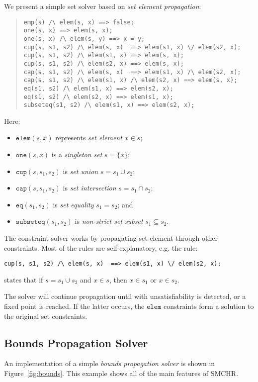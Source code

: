 \documentclass{article}
\begin{document}
We present a simple set solver based on
\emph{set element propagation}:
{
    \small
\begin{quote}
\begin{verbatim}
emp(s) /\ elem(s, x) ==> false;
one(s, x) ==> elem(s, x);
one(s, x) /\ elem(s, y) ==> x = y;
cup(s, s1, s2) /\ elem(s, x)  ==> elem(s1, x) \/ elem(s2, x);
cup(s, s1, s2) /\ elem(s1, x) ==> elem(s, x);
cup(s, s1, s2) /\ elem(s2, x) ==> elem(s, x);
cap(s, s1, s2) /\ elem(s, x)  ==> elem(s1, x) /\ elem(s2, x);
cap(s, s1, s2) /\ elem(s1, x) /\ elem(s2, x) ==> elem(s, x);
eq(s1, s2) /\ elem(s1, x) ==> elem(s2, x);
eq(s1, s2) /\ elem(s2, x) ==> elem(s1, x);
subseteq(s1, s2) /\ elem(s1, x) ==> elem(s2, x);
\end{verbatim}
\end{quote}
}
\noindent Here:
\begin{itemize}
\item $\mathtt{elem}(s, x)$ represents \emph{set element} $x \in s$;
\item $\mathtt{one}(s, x)$ is a \emph{singleton set} $s = \{x\}$;
\item $\mathtt{cup}(s, s_1, s_2)$ is \emph{set union} $s = s_1 \cup s_2$;
\item $\mathtt{cap}(s, s_1, s_2)$ is \emph{set intersection}
    $s = s_1 \cap s_2$;
\item $\mathtt{eq}(s_1, s_2)$ is \emph{set equality} $s_1 = s_2$; and
\item $\mathtt{subseteq}(s_1, s_2)$ is \emph{non-strict set subset}
    $s_1 \subseteq s_2$.
\end{itemize}
The constraint solver works by propagating set element through other
constraints.
Most of the rules are self-explanatory, e.g. the rule:
\begin{verbatim}
cup(s, s1, s2) /\ elem(s, x)  ==> elem(s1, x) \/ elem(s2, x);
\end{verbatim}
states that if $s = s_1 \cup s_2$ and $x \in s$, then
$x \in s_1$ or $x \in s_2$.

The solver will continue propagation until with unsatisfiability is detected,
or a fixed point is reached.
If the latter occurs, the $\mathtt{elem}$ constraints form a solution to the
original set constraints.

\subsection{Bounds Propagation Solver}

An implementation of a simple \emph{bounds propagation solver} is shown
in Figure~\ref{fig:bounds}.
This example shows all of the main features of SMCHR.
\end{document}
